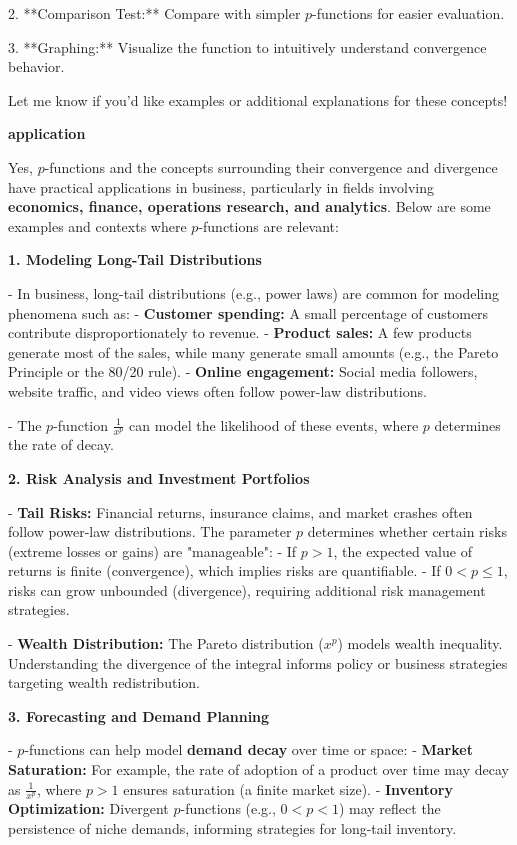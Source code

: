 \documentclass[a4paper,12pt]{book}
\begin{document}
2. **Comparison Test:** Compare with simpler \( p \)-functions for easier evaluation.

3. **Graphing:** Visualize the function to intuitively understand convergence behavior.

Let me know if you'd like examples or additional explanations for these concepts!

\textbf{application}

Yes, \( p \)-functions and the concepts surrounding their convergence and divergence have practical applications in business, particularly in fields involving \textbf{economics, finance, operations research, and analytics}. Below are some examples and contexts where \( p \)-functions are relevant:

\textbf{1. Modeling Long-Tail Distributions}

- In business, long-tail distributions (e.g., power laws) are common for modeling phenomena such as:  - \textbf{Customer spending:} A small percentage of customers contribute disproportionately to revenue.
  - \textbf{Product sales:} A few products generate most of the sales, while many generate small amounts (e.g., the Pareto Principle or the 80/20 rule).
  - \textbf{Online engagement:} Social media followers, website traffic, and video views often follow power-law distributions.


- The \( p \)-function \( \frac{1}{x^p} \) can model the likelihood of these events, where \( p \) determines the rate of decay.

\textbf{2. Risk Analysis and Investment Portfolios}

- \textbf{Tail Risks:}    Financial returns, insurance claims, and market crashes often follow power-law distributions. The parameter \( p \) determines whether certain risks (extreme losses or gains) are "manageable":
  - If \( p > 1 \), the expected value of returns is finite (convergence), which implies risks are quantifiable.
  - If \( 0 < p \leq 1 \), risks can grow unbounded (divergence), requiring additional risk management strategies.
  
- \textbf{Wealth Distribution:}    The Pareto distribution (\( x^p \)) models wealth inequality. Understanding the divergence of the integral informs policy or business strategies targeting wealth redistribution.

\textbf{3. Forecasting and Demand Planning}

- \( p \)-functions can help model \textbf{demand decay} over time or space:  - \textbf{Market Saturation:} For example, the rate of adoption of a product over time may decay as \( \frac{1}{x^p} \), where \( p > 1 \) ensures saturation (a finite market size).
  - \textbf{Inventory Optimization:} Divergent \( p \)-functions (e.g., \( 0 < p < 1 \)) may reflect the persistence of niche demands, informing strategies for long-tail inventory.
\end{document}
